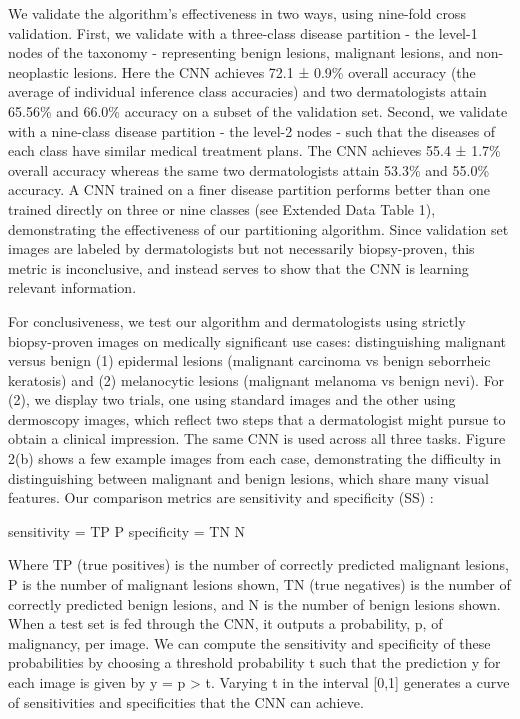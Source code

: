 We validate the algorithm’s effectiveness in two ways, using nine-fold cross validation. First, we validate with a three-class disease partition - the level-1 nodes of the taxonomy - representing benign lesions, malignant lesions, and non-neoplastic lesions. Here the CNN achieves 72.1 ± 0.9\% overall accuracy (the average of individual inference class accuracies) and two dermatologists attain 65.56\% and 66.0\% accuracy on a subset of the validation set. Second, we validate with a nine-class disease partition - the level-2 nodes - such that the diseases of each class have similar medical treatment plans. The CNN achieves 55.4 ± 1.7\% overall accuracy whereas the same two dermatologists attain 53.3\% and 55.0\% accuracy. A CNN trained on a finer disease partition performs better than one trained directly on three or nine classes (see Extended Data Table 1), demonstrating the effectiveness of our partitioning algorithm. Since validation set images are labeled by dermatologists but not necessarily biopsy-proven, this metric is inconclusive, and instead serves to show that the CNN is learning relevant information.

For conclusiveness, we test our algorithm and dermatologists using strictly biopsy-proven images on medically significant use cases: distinguishing malignant versus benign (1) epidermal lesions (malignant carcinoma vs benign seborrheic keratosis) and (2) melanocytic lesions (malignant melanoma vs benign nevi). For (2), we display two trials, one using standard images and the other using dermoscopy images, which reflect two steps that a dermatologist might pursue to obtain a clinical impression. The same CNN is used across all three tasks. Figure 2(b) shows a few example images from each case, demonstrating the difficulty in distinguishing between malignant and benign lesions, which share many visual features. Our comparison metrics are sensitivity and specificity (SS) :

	sensitivity = TP P
	specificity = TN N

Where TP (true positives) is the number of correctly predicted malignant lesions, P is the number of malignant lesions shown, TN (true negatives) is the number of correctly predicted benign lesions, and N is the number of benign lesions shown. When a test set is fed through the CNN, it outputs a probability, p, of malignancy, per image. We can compute the sensitivity and specificity of these probabilities by choosing a threshold probability t such that the prediction y for each image is given by y = p > t. Varying t in the interval [0,1] generates a curve of sensitivities and specificities that the CNN can achieve.

